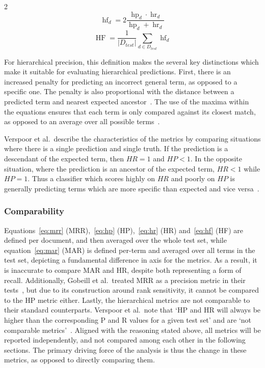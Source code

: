 \documentclass[11pt]{article}
\theoremstyle{plain}
\theoremstyle{definition}
\begin{document}
\begin{multicols}{2}
    \begin{equation}\label{eq:hfd}
        \operatorname{hf}_d = 2 \frac{\operatorname{hp}_d \cdot \operatorname{hr}_d}{\operatorname{hp}_d + \operatorname{hr}_d}
    \end{equation}
    \break{}
    \begin{equation}\label{eq:hf}
        \operatorname{HF} = \frac{1}{|D_{test}|} \sum_{d \in D_{test}} \operatorname{hf}_d
    \end{equation}
\end{multicols}

For hierarchical precision, this definition makes the several key distinctions which make it suitable for evaluating hierarchical predictions. First, there is an increased penalty for predicting an incorrect general term, as opposed to a specific one. The penalty is also proportional with the distance between a predicted term and nearest expected ancestor~\cite{verspoor/2006/categorization}. The use of the maxima within the equations ensures that each term is only compared against its closest match, as opposed to an average over all possible terms~\cite{verspoor/2006/categorization}.

Verspoor et al.\ describe the characteristics of the metrics by comparing situations where there is a single prediction and single truth. If the prediction is a descendant of the expected term, then $HR=1$ and $HP<1$. In the opposite situation, where the prediction is an ancestor of the expected term, $HR < 1$ while $HP=1$. Thus a classifier which scores highly on $HR$ and poorly on $HP$ is generally predicting terms which are more specific than expected and vice versa~\cite{verspoor/2006/categorization}.

\subsubsection{Comparability}\label{sec:methods-metrics-comparability}

Equations~\ref{eq:mrr} (MRR),~\ref{eq:hp} (HP),~\ref{eq:hr} (HR) and~\ref{eq:hf} (HF) are defined per document, and then averaged over the whole test set, while equation~\ref{eq:mar} (MAR) is defined per-term and averaged over all terms in the test set, depicting a fundamental difference in axis for the metrics. As a result, it is inaccurate to compare MAR and HR, despite both representing a form of recall. Additionally, Gobeill et al.\ treated MRR as a precision metric in their tests~\cite{gobeill/2013/managing}, but due to its construction around rank sensitivity, it cannot be compared to the HP metric either. Lastly, the hierarchical metrics are not comparable to their standard counterparts. Verspoor et al.\ note that `HP and HR will always be higher than the corresponding P and R values for a given test set' and are `not comparable metrics'~\cite{verspoor/2006/categorization}. Aligned with the reasoning stated above, all metrics will be reported independently, and not compared among each other in the following sections. The primary driving force of the analysis is thus the change in these metrics, as opposed to directly comparing them.
\end{document}
